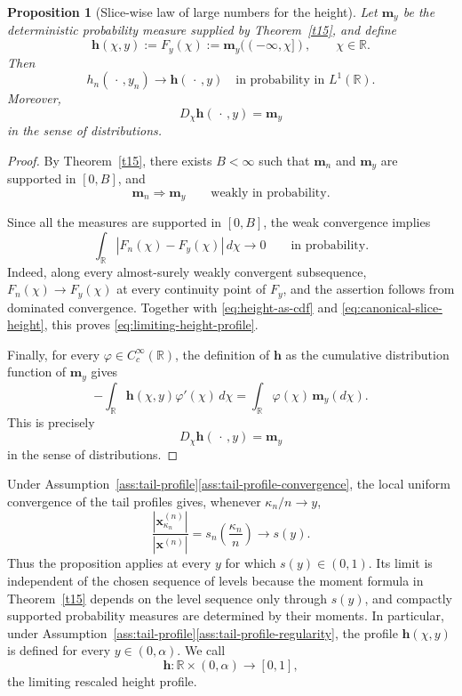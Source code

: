 \documentclass[11pt]{amsart}
\theoremstyle{plain}
\newtheorem{proposition}[theorem]{Proposition}
\numberwithin{equation}{section}
\numberwithin{theorem}{section}
\numberwithin{figure}{section}
\begin{document}
\begin{proposition}[Slice-wise law of large numbers for the height]
\label{prop:slice-height-lln}
Let \(\mathbf m_y\) be the deterministic probability measure supplied
by Theorem~\ref{t15}, and define
\begin{equation}
    \mathbf h(\chi,y)
    :=F_y(\chi)
    :=\mathbf m_y(({-}\infty,\chi]),
    \qquad \chi\in\mathbb R.
    \label{eq:canonical-slice-height}
\end{equation}
Then
\begin{equation}
    h_n(\,\cdot\,,y_n)
    \longrightarrow
    \mathbf h(\,\cdot\,,y)
    \quad\text{in probability in }L^1(\mathbb R).
    \label{eq:limiting-height-profile}
\end{equation}
 Moreover,
\[
    D_\chi\mathbf h(\,\cdot\,,y)=\mathbf m_y
\]
in the sense of distributions.
\end{proposition}

\begin{proof}


By Theorem~\ref{t15}, there exists \(B<\infty\) such that
\(\mathbf m_n\) and \(\mathbf m_y\) are supported in \([0,B]\), and
\[
    \mathbf m_n\Longrightarrow\mathbf m_y
    \qquad\text{weakly in probability}.
\]


Since all the measures are supported in \([0,B]\), the weak
convergence implies
\[
    \int_{\mathbb R}|F_n(\chi)-F_y(\chi)|\,d\chi
    \longrightarrow0
    \qquad\text{in probability}.
\]
Indeed, along every almost-surely weakly convergent subsequence,
\(F_n(\chi)\to F_y(\chi)\) at every continuity point of \(F_y\), and
the assertion follows from dominated convergence.
Together with \eqref{eq:height-as-cdf} and
\eqref{eq:canonical-slice-height}, this proves
\eqref{eq:limiting-height-profile}.

Finally, for every
\(\varphi\in C_c^\infty(\mathbb R)\), the definition of
\(\mathbf h\) as the cumulative distribution function of
\(\mathbf m_y\) gives
\[
    -\int_{\mathbb R}
        \mathbf h(\chi,y)\varphi'(\chi)\,d\chi
    =
    \int_{\mathbb R}
        \varphi(\chi)\,\mathbf m_y(d\chi).
\]
This is precisely
\[
    D_\chi\mathbf h(\,\cdot\,,y)=\mathbf m_y
\]
in the sense of distributions.
\end{proof}



Under
Assumption~\ref{ass:tail-profile}\ref{ass:tail-profile-convergence},
the local uniform convergence of the tail profiles gives, whenever
\(\kappa_n/n\to y\),
\[
    \frac{|\mathbf x_{\kappa_n}^{(n)}|}{|\mathbf x^{(n)}|}
    =s_n\left(\frac{\kappa_n}{n}\right)
    \longrightarrow s(y).
\]
Thus the proposition applies at every \(y\) for which
\(s(y)\in(0,1)\). Its limit is independent of the chosen sequence of
levels because the moment formula in Theorem~\ref{t15} depends on the
level sequence only through \(s(y)\), and compactly supported
probability measures are determined by their moments. In particular,
under
Assumption~\ref{ass:tail-profile}\ref{ass:tail-profile-regularity},
the profile \(\mathbf h(\chi,y)\) is defined for every
\(y\in(0,\alpha)\).  We call \[
    \mathbf h:\mathbb R\times(0,\alpha)\longrightarrow[0,1],
\]
the limiting rescaled height profile.
\endgroup
\end{document}

